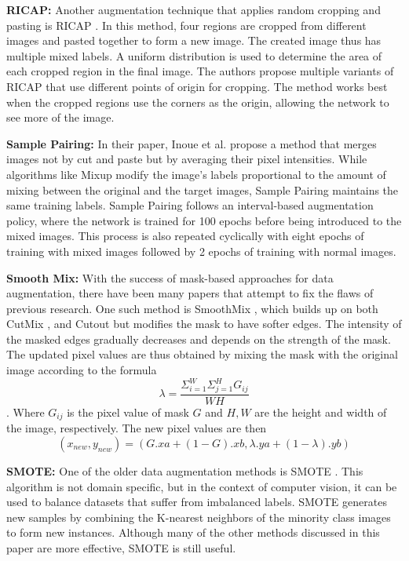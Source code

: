 \documentclass[a4paper,11pt,openright]{book}
\begin{document}
\textbf{RICAP: }
Another augmentation technique that applies random cropping and pasting is RICAP \cite{takahashiDataAugmentationUsing2020}. In this method, four regions are cropped from different images and pasted together to form a new image. The created image thus has multiple mixed labels. A uniform distribution is used to determine the area of each cropped region in the final image. The authors propose multiple variants of RICAP that use different points of origin for cropping. The method works best when the cropped regions use the corners as the origin, allowing the network to see more of the image.

\textbf{Sample Pairing: }
In their paper, Inoue et al. propose a method that merges images not by cut and paste but by averaging their pixel intensities. While algorithms like Mixup \cite{zhangMixupEmpiricalRisk2018} modify the image's labels proportional to the amount of mixing between the original and the target images, Sample Pairing \cite{inoueDataAugmentationPairing2018} maintains the same training labels. Sample Pairing follows an interval-based augmentation policy, where the network is trained for 100 epochs before being introduced to the mixed images. This process is also repeated cyclically with eight epochs of training with mixed images followed by 2 epochs of training with normal images.

\textbf{Smooth Mix: }
With the success of mask-based approaches for data augmentation, there have been many papers that attempt to fix the flaws of previous research. One such method is SmoothMix \cite{leeSmoothMixSimpleEffective2020}, which builds up on both CutMix \cite{yunCutMixRegularizationStrategy2019}, and Cutout \cite{devriesImprovedRegularizationConvolutional2017} but modifies the mask to have softer edges. The intensity of the masked edges gradually decreases and depends on the strength of the mask. The updated pixel values are thus obtained by mixing the mask with the original image according to the formula $$\lambda= \frac{\Sigma_{i=1}^{W}\Sigma_{j=1}^{H}G_{ij}}{WH}$$. Where $G_{ij}$ is the pixel value of mask $G$ and $H, W$ are the height and width of the image, respectively. The new pixel values are then $$(x_{new} , y_{new}) = (G.xa + (1 - G).xb , \lambda.ya + (1 - \lambda).yb)$$

\textbf{SMOTE: }
One of the older data augmentation methods is SMOTE \cite{SMOTESyntheticMinority}. This algorithm is not domain specific, but in the context of computer vision, it can be used to balance datasets that suffer from imbalanced labels. SMOTE generates new samples by combining the K-nearest neighbors of the minority class images to form new instances. Although many of the other methods discussed in this paper are more effective, SMOTE is still useful.
\end{document}
